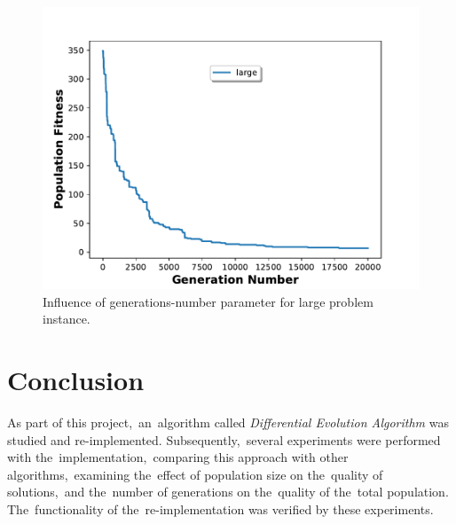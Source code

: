 \begin{figure}[h]
\centering
\includegraphics[height=0.30\textheight]{figures/large_generation.pdf}
\caption{Influence of generations-number parameter for large problem instance.}%
\label{fig:largeg}%
\end{figure}

\section{Conclusion} \label{sec:conclusion}

As part of this project,~an~algorithm called \textit{Differential Evolution Algorithm} was studied and re-implemented.
Subsequently,~several experiments were performed with the~implementation,~comparing this approach with other algorithms,~examining the~effect of population size on the~quality of solutions,~and the~number of generations on the~quality of the~total population.
The~functionality of the~re-implementation was verified by these experiments.